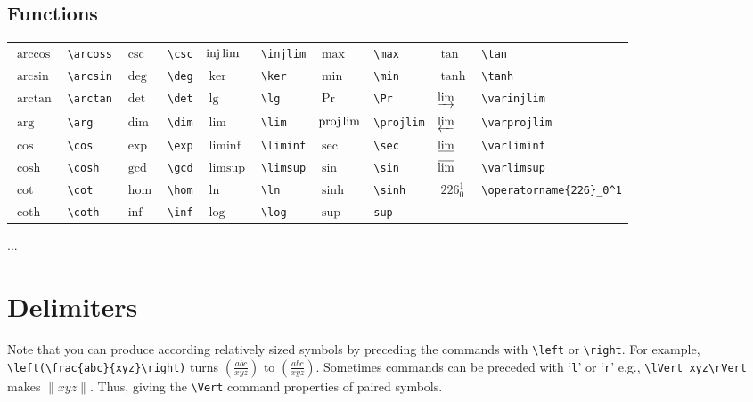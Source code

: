 \documentclass[10pt, english]{article}
\begin{document}
	\subsection{Functions}

	\begin{center}
		\scriptsize
	\begin{tabular}{ll|ll|ll|ll|ll}
		$\arccos$ & \verb|\arcoss| & $\csc$ & \verb|\csc| & $\injlim$ & \verb|\injlim| & $\max$ & \verb|\max| & $\tan$ & \verb|\tan| \\
		$\arcsin$ & \verb|\arcsin| & $\deg$ & \verb|\deg| & $\ker$ & \verb|\ker| & $\min$ & \verb|\min| & $\tanh$ & \verb|\tanh| \\
		$\arctan$ & \verb|\arctan| & $\det$ & \verb|\det| & $\lg$ & \verb|\lg| & $\Pr$ & \verb|\Pr| & $\varinjlim$ & \verb|\varinjlim| \\
		$\arg$ & \verb|\arg| & $\dim$ & \verb|\dim| & $\lim$ & \verb|\lim| & $\projlim$ & \verb|\projlim| & $\varprojlim$ & \verb|\varprojlim| \\
		$\cos$ & \verb|\cos| & $\exp$ & \verb|\exp| & $\liminf$ & \verb|\liminf| & $\sec$ & \verb|\sec| & $\varliminf$ & \verb|\varliminf| \\
		$\cosh$ & \verb|\cosh| & $\gcd$ & \verb|\gcd| & $\limsup$ & \verb|\limsup| & $\sin$ & \verb|\sin| & $\varlimsup$ & \verb|\varlimsup| \\
		$\cot$ & \verb|\cot| & $\hom$ & \verb|\hom| & $\ln$ & \verb|\ln| & $\sinh$ & \verb|\sinh| & $\operatorname{226}_0^1$ & \verb|\operatorname{226}_0^1| \\
		$\coth$ & \verb|\coth| & $\inf$ & \verb|\inf| & $\log$ & \verb|\log| & $\sup$ & \verb|sup| \\ 
	\end{tabular}
	\end{center}

	...

\section{Delimiters}

	Note that you can produce according relatively sized symbols by preceding the commands with \verb|\left| or \verb|\right|. For example, \verb|\left(\frac{abc}{xyz}\right)| turns $(\frac{abc}{xyz})$ to $\left(\frac{abc}{xyz}\right)$. Sometimes commands can be preceded with  `\verb|l|' or `\verb|r|' e.g., \verb|\lVert xyz\rVert| makes $\lVert xyz\rVert$. Thus, giving the \verb|\Vert| command properties of paired symbols.
\end{document}

